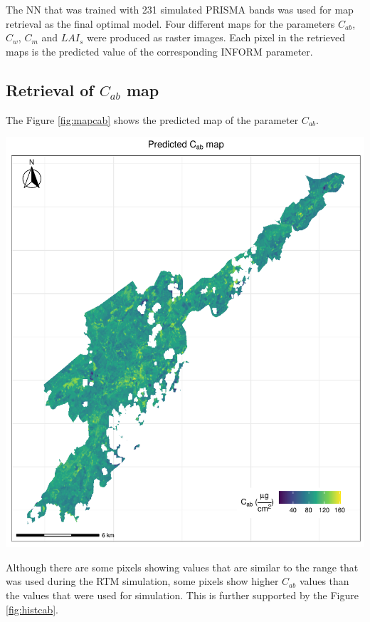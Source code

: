 \documentclass[a4paper, twoside]{templates/ociamthesis}
\let\origfigure\figure
\let\endorigfigure\endfigure
\renewenvironment{figure}[1][2] {
    \expandafter\origfigure\expandafter[H]
} {
    \endorigfigure
}
\begin{document}
The NN that was trained with 231 simulated PRISMA bands was used for map retrieval as the final optimal model. Four different maps for the parameters \(C_{ab}\), \(C_{w}\), \(C_{m}\) and \(LAI_{s}\) were produced as raster images. Each pixel in the retrieved maps is the predicted value of the corresponding INFORM parameter.

\hypertarget{retrieval-of-c_ab-map}{%
\subsection{\texorpdfstring{Retrieval of \(C_{ab}\) map}{Retrieval of C\_\{ab\} map}}\label{retrieval-of-c_ab-map}}

The Figure \ref{fig:mapcab} shows the predicted map of the parameter \(C_{ab}\).

\begin{figure}
\includegraphics[width=0.9\linewidth]{./figures/cab_map} \caption{Predicted map of the parameter $C_{ab}$}\label{fig:mapcab}
\end{figure}

Although there are some pixels showing values that are similar to the range that was used during the RTM simulation, some pixels show higher \(C_{ab}\) values than the values that were used for simulation. This is further supported by the Figure \ref{fig:histcab}.
\end{document}
